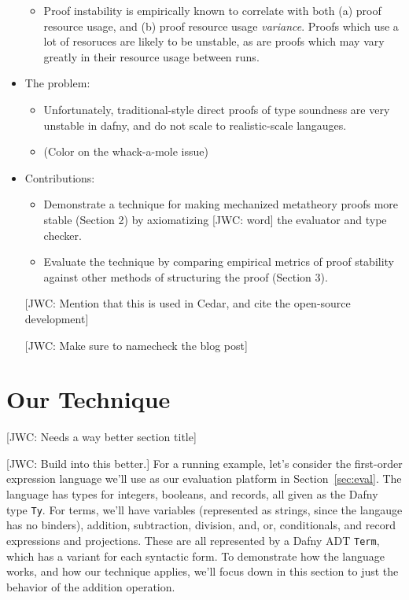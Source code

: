 \documentclass[sigplan,review,screen,anonymous]{acmart}
\newcommand{\comm}[3]{\textcolor{#1}{[#2: #3]}}
\newcommand{\jwc}[1]{\comm{dkgreen}{JWC}{#1}}
\begin{document}
\begin{itemize}
\begin{itemize}
      \item Proof instability is empirically known to correlate with both (a) proof resource usage, and (b) proof resource usage \emph{variance}.
      Proofs which use a lot of resoruces are likely to be unstable, as are proofs which may vary greatly in their resource usage between runs.
    \end{itemize}

    \item The problem:
    \begin{itemize}
      \item Unfortunately, traditional-style direct proofs of type soundness are very unstable in dafny, and do not scale to realistic-scale langauges.
      \item (Color on the whack-a-mole issue) 
    \end{itemize}

    \item Contributions: 
    \begin{itemize}
      \item Demonstrate a technique for making mechanized metatheory proofs more stable (Section 2) by axiomatizing \jwc{word} the evaluator and type checker.
      \item Evaluate the technique by comparing empirical metrics of proof stability against other methods of structuring the proof (Section 3).
    \end{itemize}

    \jwc{Mention that this is used in Cedar, and cite the open-source development}

    \jwc{Make sure to namecheck the blog post}
    
\end{itemize}

\section{Our Technique}
\label{sec:sts}

\jwc{Needs a way better section title}

\jwc{Build into this better.}
For a running example, let's consider the first-order expression language we'll
use as our evaluation platform in Section~\ref{sec:eval}.  The language has
types for integers, booleans, and records, all given as the Dafny type
\texttt{Ty}.  For terms, we'll have variables (represented as strings, since the
langauge has no binders), addition, subtraction, division, and, or,
conditionals, and record expressions and projections. These are all represented
by a Dafny ADT \texttt{Term}, which has a variant for each syntactic form.
To demonstrate how the language works, and how our technique applies, we'll focus
down in this section to just the behavior of the addition operation.
\end{document}
